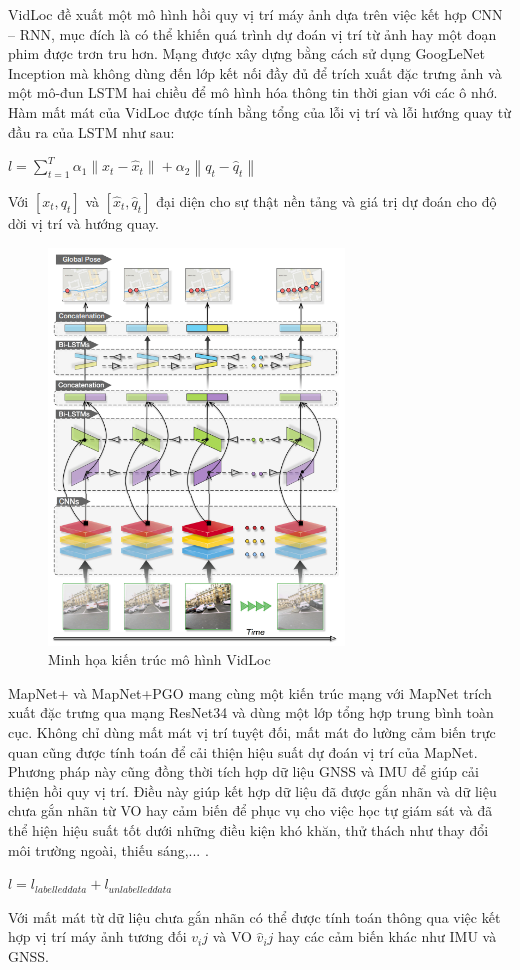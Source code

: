 VidLoc \cite{clark2017vidloc} đề xuất một mô hình hồi quy vị trí máy ảnh dựa trên việc kết hợp CNN – RNN, mục đích là có thể khiến quá trình dự đoán vị trí từ ảnh hay một đoạn phim được trơn tru hơn. Mạng được xây dựng bằng cách sử dụng GoogLeNet Inception \cite{szegedy2014going} mà không dùng đến lớp kết nối đầy đủ để trích xuất đặc trưng ảnh và một mô-đun LSTM hai chiều để mô hình hóa thông tin thời gian với các ô nhớ.  Hàm mất mát của VidLoc được tính bằng tổng của lỗi vị trí và lỗi hướng quay từ đầu ra của LSTM như sau:
\begin{center}
$ l = \sum_{t=1}^T \alpha_1 \left \| x_t - \hat{x}_t \right \| + \alpha_2 \left \| q_t - \hat{q}_t \right \| $
\end{center}
Với $[x_t, q_t]$ và $[\hat{x}_t, \hat{q}_t]$ đại diện cho sự thật nền tảng và giá trị dự đoán cho độ dời vị trí và hướng quay.
\begin{figure}[H]
    \centering
    \includegraphics[width=0.7\textwidth]{pics/Chapter2/vidloc.png}
    \caption{Minh họa kiến trúc mô hình VidLoc \cite{clark2017vidloc}}
\end{figure}
MapNet+ và MapNet+PGO \cite{brahmbhatt2018geometryaware} mang cùng một kiến trúc mạng với MapNet trích xuất đặc trưng qua mạng ResNet34 và dùng một lớp tổng hợp trung bình toàn cục. Không chỉ dùng mất mát vị trí tuyệt đối, mất mát đo lường cảm biến trực quan cũng được tính toán để cải thiện hiệu suất dự đoán vị trí của MapNet. Phương pháp này cũng đồng thời tích hợp dữ liệu GNSS và IMU để giúp cải thiện hồi quy vị trí. Điều này giúp kết hợp dữ liệu đã được gắn nhãn và dữ liệu chưa gắn nhãn từ VO hay cảm biến để phục vụ cho việc học tự giám sát và đã thể hiện hiệu suất tốt dưới những điều kiện khó khăn, thử thách như thay đổi môi trường ngoài, thiếu sáng,... .
\begin{center}
$l = l_{labelled data} + l_{unlabelled data}$
\end{center}
Với mất mát từ dữ liệu chưa gắn nhãn có thể được tính toán thông qua việc kết hợp vị trí máy ảnh tương đối $v_ij$ và VO $\hat{v}_ij$ hay các cảm biến khác như IMU và GNSS. 

